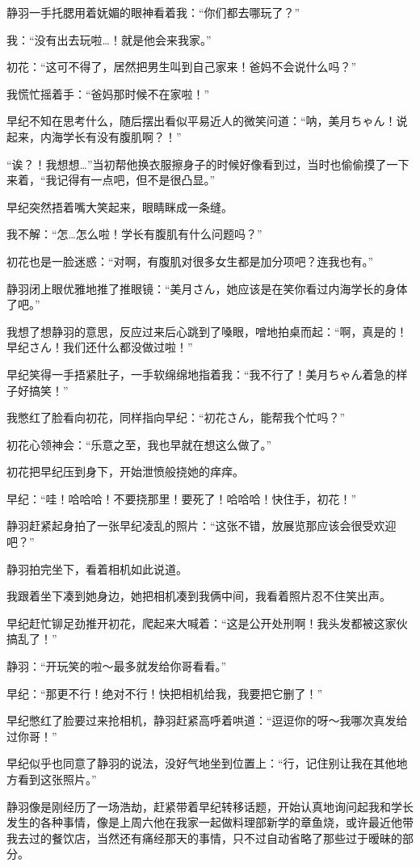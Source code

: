 静羽一手托腮用着妩媚的眼神看着我：“你们都去哪玩了？”

我：“没有出去玩啦…！就是他会来我家。”

初花：“这可不得了，居然把男生叫到自己家来！爸妈不会说什么吗？”

我慌忙摇着手：“爸妈那时候不在家啦！”

早纪不知在思考什么，随后摆出看似平易近人的微笑问道：“呐，美月ちゃん！说起来，内海学长有没有腹肌啊？！”

“诶？！我想想…”当初帮他换衣服擦身子的时候好像看到过，当时也偷偷摸了一下来着，“我记得有一点吧，但不是很凸显。”

早纪突然捂着嘴大笑起来，眼睛眯成一条缝。

我不解：“怎…怎么啦！学长有腹肌有什么问题吗？”

初花也是一脸迷惑：“对啊，有腹肌对很多女生都是加分项吧？连我也有。”

静羽闭上眼优雅地推了推眼镜：“美月さん，她应该是在笑你看过内海学长的身体了吧。”

我想了想静羽的意思，反应过来后心跳到了嗓眼，噌地拍桌而起：“啊，真是的！早纪さん！我们还什么都没做过啦！”

早纪笑得一手捂紧肚子，一手软绵绵地指着我：“我不行了！美月ちゃん着急的样子好搞笑！\laughtear”

我憋红了脸看向初花，同样指向早纪：“初花さん，能帮我个忙吗？”

初花心领神会：“乐意之至，我也早就在想这么做了。”

初花把早纪压到身下，开始泄愤般挠她的痒痒。

早纪：“哇！哈哈哈！不要挠那里！要死了！哈哈哈！快住手，初花！”

静羽赶紧起身拍了一张早纪凌乱的照片：“这张不错，放展览那应该会很受欢迎吧？”

静羽拍完坐下，看着相机如此说道。

我跟着坐下凑到她身边，她把相机凑到我俩中间，我看着照片忍不住笑出声。

早纪赶忙铆足劲推开初花，爬起来大喊着：“这是公开处刑啊！我头发都被这家伙搞乱了！”

静羽：“开玩笑的啦～最多就发给你哥看看。”

早纪：“那更不行！绝对不行！快把相机给我，我要把它删了！”

早纪憋红了脸要过来抢相机，静羽赶紧高呼着哄道：“逗逗你的呀～我哪次真发给过你哥！”

早纪似乎也同意了静羽的说法，没好气地坐到位置上：“行，记住别让我在其他地方看到这张照片。”

静羽像是刚经历了一场浩劫，赶紧带着早纪转移话题，开始认真地询问起我和学长发生的各种事情，像是上周六他在我家一起做料理部新学的章鱼烧，或许最近他带我去过的餐饮店，当然还有痛经那天的事情，只不过自动省略了那些过于暧昧的部分。

